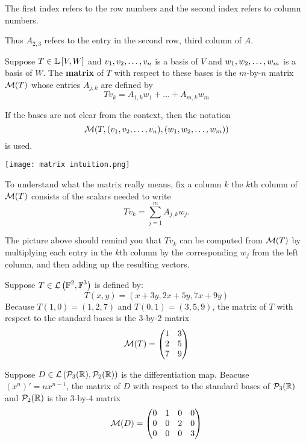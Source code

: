 The first index refers to the row numbers and the second index
refers to column numbers.

Thus $A_{2,3}$ refers to the entry in the second row, third column of $A$.

\begin{definition} 
   Suppose $T \in \mathbb{L}\left[ V,W \right]$ and $v_1, v_2, \ldots, v_n$ is a basis of $V$ and
   $w_1, w_2, \ldots, w_{m}$ is a basis of $W$. The \textbf{matrix} of $T$ with respect
   to these bases is the $m$-by-$n$ matrix $\mathcal{M}(T)$ whose entries
   $A_{j, k}$ are defined by
   \[ Tv_k = A_{1, k}w_1 + \dots + A_{m,k}w_m \]

   If the bases are not clear from the context, then the notation
   \[ \mathcal{M}(T, (v_1, v_2, \ldots, v_n), (w_1, w_2, \ldots, w_{m})) \]
   is used.
\end{definition}

\texttt{[image: matrix intuition.png]}

To understand what the matrix really means, fix a column $k$
the $k$th column of $\mathcal{M}(T)$ consists of the scalars needed to write
\[ Tv_k = \sum_{j=1}^m A_{j,k}w_j.\]

The picture above should remind you that $Tv_k$ can be computed from
$\mathcal{M}(T)$ by multiplying each entry in the $k$th column by the corresponding
$w_j$ from the left column, and then adding up the resulting vectors.

\begin{example} [Matrices]
   Suppose $T \in \mathcal{L} \left( \operatorname{\mathbb{F}}^2, \operatorname{\mathbb{F}}^3 \right)$ is defined by:
   \[ T(x,y) = (x+3y, 2x+5y, 7x+9y) \]
   Because $T(1, 0) = (1, 2, 7)$ and $T(0, 1) = (3, 5, 9)$, the matrix of
   $T$ with respect to the standard bases is the 3-by-2 matrix
   \[ \mathcal{M}(T) = \begin{pmatrix}
      1 & 3 \\
      2 & 5 \\
      7 & 9
   \end{pmatrix} \]

   Suppose $D \in \mathcal{L} \left( \mathcal{P}_{3}(\operatorname{\mathbb{R}}), \mathcal{P}_{2}(\operatorname{\mathbb{R}}) \right)$ is the differentiation
   map. Beacuse $(x^n)' = nx^{n-1}$, the matrix of $D$ with respect
   to the standard bases of $\mathcal{P}_{3}(\operatorname{\mathbb{R}})$ and $\mathcal{P}_{2}(\operatorname{\mathbb{R}})$ is the
   3-by-4 matrix
   \[ \mathcal{M}(D) = \begin{pmatrix}
      0 & 1 & 0 & 0 \\
      0 & 0 & 2 & 0 \\
      0 & 0 & 0 & 3 \\
   \end{pmatrix}\]
\end{example}

